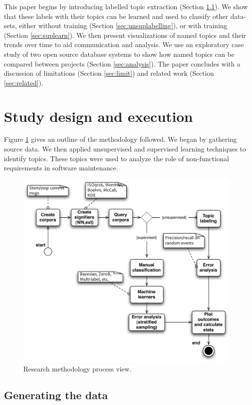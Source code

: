\documentclass[]{sig-alternate}
\begin{document}
This paper begins by introducing labelled topic extraction (Section \ref{sec:wordlist}). We show that these labels with their topics can be learned and used to classify other data-sets, either without training (Section \ref{sec:unsuplabelling}), or with training (Section \ref{sec:suplearn}). We then present visualizations of named topics and their trends over time to aid communication and analysis. We use an exploratory case study of two open source database systems to show how named topics can be compared between projects  (Section \ref{sec:analysis}). The paper concludes with a discussion of limitations (Section \ref{sec:limit}) and related work (Section \ref{sec:related}).



\section{Study design and execution}
Figure \ref{fig:process} gives an outline of the methodology followed. We began by gathering source data. We then applied unsupervised and supervised learning techniques to identify topics. These topics were used to analyze the role of non-functional requirements in software maintenance.

\begin{figure}
  \centering
 \includegraphics[width=.45\textwidth]{figures/process-model}
 \caption{Research methodology process view.}
  \label{fig:process}
\end{figure}

\subsection{Generating the data}
\label{sec:wordlist}
\end{document}
